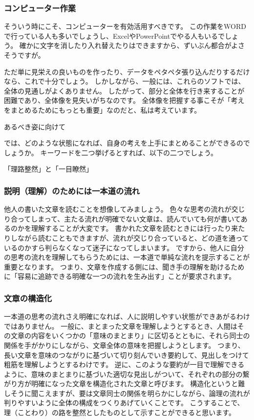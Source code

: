 \documentclass[12pt,a4paper]{jsarticle}
\makeatletter
\def\subsection{\@startsection 
{subsection}
{1}
{\z@}
{3.5ex plus -1ex minus -.2ex}
{1.ex plus .2ex}
{\large\bf}
}
\makeatother
\begin{document}
\subsubsection{コンピューター作業}

そういう時にこそ、コンピューターを有効活用すべきです。
この作業をWORDで行っている人も多いでしょうし、ExcelやPowerPointでやる人もいるでしょう。
確かに文字を消したり入れ替えたりはできますから、ずいぶん都合がよさそうですが。

ただ単に見栄えの良いものを作ったり、データをペタペタ張り込んだりするだけなら、これで十分でしょう。
しかしながら、一般には、これらのソフトでは、全体の見通しがよくありません。
したがって、部分と全体を行き来することが困難であり、全体像を見失いがちなのです。
全体像を把握する事こそが「考えをまとめるためにもっとも重要」なのだと、私は考えています。

\subsection{あるべき姿に向けて}

では、どのような状態になれば、自身の考えを上手にまとめることができるのでしょうか。
キーワードを二つ挙げるとすれば、以下の二つでしょう。

\vspace{5mm}
{\LARGE 「理路整然」と「一目瞭然」}

\subsubsection{説明（理解）のためには一本道の流れ}

他人の書いた文章を読むことを想像してみましょう。
色々な思考の流れが交じり合ってしまって、主たる流れが明確でない文章は、読んでいても何が書いてあるのかを理解することが大変です。
書かれた文章を読むときには行ったり来たりしながら読むこともできますが、流れが交じり合っていると、どの道を通っているのかすら判らなくなって迷子になってしまいます。
ですから、他人に自分の思考の流れを理解してもらうためには、一本道で単純な流れを提示することが重要となります。
つまり、文章を作成する側には、聞き手の理解を助けるために「容易に追跡できる明確な一つの流れを生み出す」ことが要求されます。

\subsubsection{文章の構造化}

一本道の思考の流れさえ明確になれば、人に説明しやすい状態ができあがるわけではありません。
一般に、まとまった文章を理解しようとするとき、人間はその文章の内容をいくつかの「意味のまとまり」に区切るとともに、それら同士の関係を手がかりにしながら、文章全体の意味を把握しようとします。
つまり、長い文章を意味のつながりに基づいて切り刻んでいき要約して、見出しをつけて粗筋を理解しようとするわけです。
逆に、このような要約が一目で理解できるように、意味のまとまりに基づいた適切な見出しがついて、それぞれの部分の繋がり方が明確になった文章を構造化された文章と呼びます。
構造化というと難しそうに聞こえますが、要は文章同士の関係を明らかにしながら、論理の流れが判りやすいように全体の構成をつくりあげていくことです。
こうすることで、理（ことわり）の路を整然としたものとして示すことができると思います。
\end{document}
